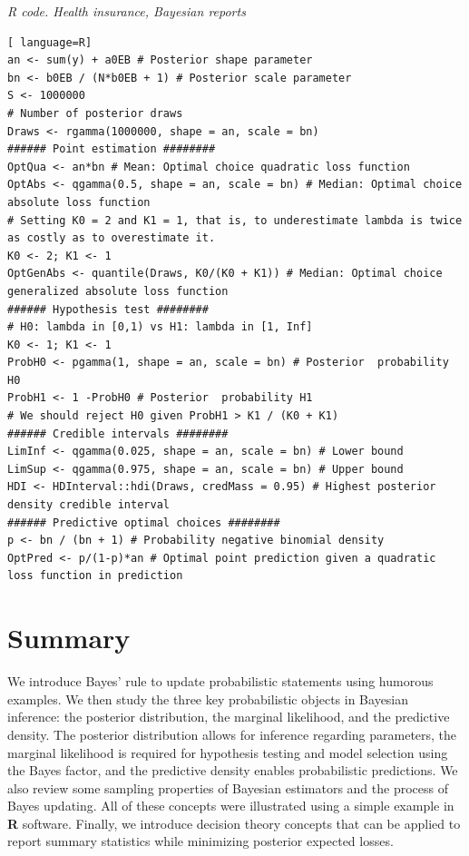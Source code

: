 \begin{tcolorbox}[enhanced,width=4.67in,center upper,
	fontupper=\large\bfseries,drop shadow southwest,sharp corners]
	\textit{R code. Health insurance, Bayesian reports}
\begin{VF}
\begin{lstlisting}[ language=R]
an <- sum(y) + a0EB # Posterior shape parameter
bn <- b0EB / (N*b0EB + 1) # Posterior scale parameter
S <- 1000000 
# Number of posterior draws
Draws <- rgamma(1000000, shape = an, scale = bn) 
###### Point estimation ########
OptQua <- an*bn # Mean: Optimal choice quadratic loss function
OptAbs <- qgamma(0.5, shape = an, scale = bn) # Median: Optimal choice absolute loss function
# Setting K0 = 2 and K1 = 1, that is, to underestimate lambda is twice as costly as to overestimate it.
K0 <- 2; K1 <- 1
OptGenAbs <- quantile(Draws, K0/(K0 + K1)) # Median: Optimal choice generalized absolute loss function
###### Hypothesis test ########
# H0: lambda in [0,1) vs H1: lambda in [1, Inf]
K0 <- 1; K1 <- 1
ProbH0 <- pgamma(1, shape = an, scale = bn) # Posterior  probability H0
ProbH1 <- 1 -ProbH0 # Posterior  probability H1
# We should reject H0 given ProbH1 > K1 / (K0 + K1) 
###### Credible intervals ########
LimInf <- qgamma(0.025, shape = an, scale = bn) # Lower bound
LimSup <- qgamma(0.975, shape = an, scale = bn) # Upper bound
HDI <- HDInterval::hdi(Draws, credMass = 0.95) # Highest posterior density credible interval
###### Predictive optimal choices ########
p <- bn / (bn + 1) # Probability negative binomial density
OptPred <- p/(1-p)*an # Optimal point prediction given a quadratic loss function in prediction
\end{lstlisting}
\end{VF}
\end{tcolorbox}

\section{Summary}
We introduce Bayes' rule to update probabilistic statements using humorous examples. We then study the three key probabilistic objects in Bayesian inference: the posterior distribution, the marginal likelihood, and the predictive density. The posterior distribution allows for inference regarding parameters, the marginal likelihood is required for hypothesis testing and model selection using the Bayes factor, and the predictive density enables probabilistic predictions. We also review some sampling properties of Bayesian estimators and the process of Bayes updating. All of these concepts were illustrated using a simple example in \textbf{R} software. Finally, we introduce decision theory concepts that can be applied to report summary statistics while minimizing posterior expected losses.
 
